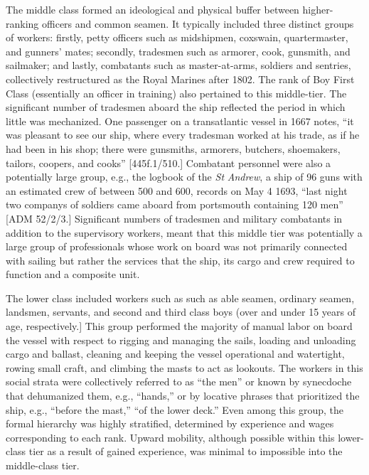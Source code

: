 The middle class formed an ideological and physical buffer between higher-ranking officers and common seamen. It typically included three distinct groups of workers: firstly, petty officers such as midshipmen, coxswain, quartermaster, and gunners’ mates; secondly, tradesmen such as armorer, cook, gunsmith, and sailmaker; and lastly, combatants such as master-at-arms, soldiers and sentries, collectively restructured as the Royal Marines after 1802. The rank of Boy First Class (essentially an officer in training) also pertained to this middle-tier.  The significant number of tradesmen aboard the ship reflected the period in which little was mechanized. One passenger on a transatlantic vessel in 1667 notes, “it was pleasant to see our ship, where every tradesman worked at his trade, as if he had been in his shop; there were gunsmiths, armorers, butchers, shoemakers, tailors, coopers, and cooks” [445f.1/510.] Combatant personnel were also a potentially large group, e.g., the logbook of the \textit{St} \textit{Andrew}, a ship of 96 guns with an estimated crew of between 500 and 600, records on May 4 1693, “last night two companys of soldiers came aboard from portsmouth containing 120 men” [ADM 52/2/3.] Significant numbers of tradesmen and military combatants in addition to the supervisory workers, meant that this middle tier was potentially a large group of professionals whose work on board was not primarily connected with sailing but rather the services that the ship, its cargo and crew required to function and a composite unit.

The lower class included workers such as such as able seamen, ordinary seamen, landsmen, servants, and second and third class boys (over and under 15 years of age, respectively.] This group performed the majority of manual labor on board the vessel with respect to rigging and managing the sails, loading and unloading cargo and ballast, cleaning and keeping the vessel operational and watertight, rowing small craft, and climbing the masts to act as lookouts. The workers in this social strata were collectively referred to as “the men” or known by synecdoche that dehumanized them, e.g., “hands,” or by locative phrases that prioritized the ship, e.g., “before the mast,” “of the lower deck.” Even among this group, the formal hierarchy was highly stratified, determined by experience and wages corresponding to each rank. Upward mobility, although possible within this lower-class tier as a result of gained experience, was minimal to impossible into the middle-class tier. 

